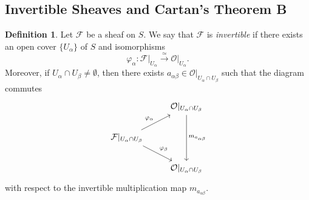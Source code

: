 \documentclass[a4paper]{report}
\theoremstyle{definition}
\newtheorem{definition}{Definition}
\theoremstyle{remark}
\theoremstyle{proposition}
\theoremstyle{conjecture}
\theoremstyle{lemma}
\theoremstyle{corollary}
\theoremstyle{exercise}
\theoremstyle{example}
\newcommand{\mcal}{\mathcal}
\begin{document}
\subsection{Invertible Sheaves and Cartan's Theorem B}

\begin{definition}
    Let $\mcal{F}$ be a sheaf on $S$. We say that $\mcal{F}$ is 
    \emph{invertible} if there exists an open cover $\lbrace U_\alpha\rbrace$
    of $S$ and isomorphisms 
    $$\varphi_\alpha : \mcal{F}\vert_{U_\alpha} \stackrel{\simeq}{\longrightarrow} \mcal{O}\vert_{U_\alpha}.$$
    Moreover, if $U_\alpha \cap U_\beta \neq \emptyset$, then 
    there exists $a_{\alpha\beta} \in \mcal{O}\vert_{U_\alpha\cap U_\beta}$ 
    such that the diagram commutes 
    $$
\begin{tikzcd}
                                                                                              & \mcal{O}\vert_{U_\alpha \cap U_\beta} \arrow[dd, "m_{a_{\alpha\beta}}"] \\
\mcal{F}\vert_{U_\alpha\cap U_\beta} \arrow[ru, "\varphi_\alpha"] \arrow[rd, "\varphi_\beta"] &                                                                    \\
                                                                                              & \mcal{O}\vert_{U_\alpha \cap U_\beta}                             
\end{tikzcd}$$
    with respect to the invertible multiplication map $m_{a_{\alpha\beta}}$.
\end{definition}
\end{document}
